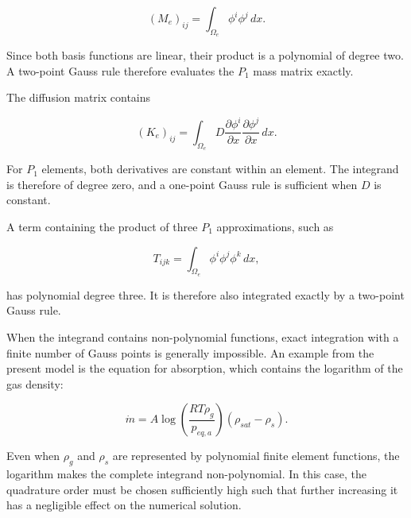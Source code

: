 \begin{equation}
    (M_e)_{ij}
    =
    \int_{\Omega_e}
    \phi^i\phi^j\,dx.
\end{equation}

Since both basis functions are linear, their product is a polynomial of degree two. A two-point Gauss rule therefore evaluates the $P_1$ mass matrix exactly.

The diffusion matrix contains

\begin{equation}
    (K_e)_{ij}
    =
    \int_{\Omega_e}
    D
    \frac{\partial\phi^i}{\partial x}
    \frac{\partial\phi^j}{\partial x}
    \,dx.
\end{equation}

For $P_1$ elements, both derivatives are constant within an element. The integrand is therefore of degree zero, and a one-point Gauss rule is sufficient when $D$ is constant.

A term containing the product of three $P_1$ approximations, such as

\begin{equation}
    T_{ijk}
    =
    \int_{\Omega_e}
    \phi^i\phi^j\phi^k\,dx,
\end{equation}

has polynomial degree three. It is therefore also integrated exactly by a two-point Gauss rule.

When the integrand contains non-polynomial functions, exact integration with a finite number of Gauss points is generally impossible. An example from the present model is the equation for absorption, which contains the logarithm of the gas density:

\begin{equation}
    \dot m
    =
    A
    \log\left(
    \frac{RT\rho_g}{p_{eq,a}}
    \right)
    \left(
    \rho_{sat}-\rho_s
    \right).
\end{equation}

Even when $\rho_g$ and $\rho_s$ are represented by polynomial finite element functions, the logarithm makes the complete integrand non-polynomial. In this case, the quadrature order must be chosen sufficiently high such that further increasing it has a negligible effect on the numerical solution.

